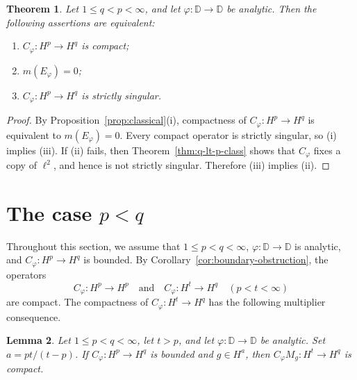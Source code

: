 \documentclass[11pt, reqno]{amsart}
\newtheorem{theorem}{Theorem}[section]
\newtheorem{lemma}[theorem]{Lemma}
\theoremstyle{definition}
\theoremstyle{remark}
\newcommand{\D}{\mathbb{D}}
\begin{document}
\begin{theorem}
\label{thm:q-lt-p-identity}
Let \(1\le q<p<\infty\), and let \(\varphi:\D\to\D\) be analytic.
Then the following assertions are equivalent:
\begin{enumerate}[label=\textup{(\roman*)}]
\item \(C_\varphi:H^p\to H^q\) is compact;
\item \(m(E_\varphi)=0\);
\item \(C_\varphi:H^p\to H^q\) is strictly singular.
\end{enumerate}
\end{theorem}

\begin{proof}
By
Proposition~\ref{prop:classical}\textup{(i)},
compactness of \(C_\varphi:H^p\to H^q\) is equivalent to
\(m(E_\varphi)=0\). Every compact operator is strictly singular, so
\textup{(i)} implies \textup{(iii)}. If \textup{(ii)} fails, then
Theorem~\ref{thm:q-lt-p-class} shows that
\(C_\varphi\) fixes a copy of \(\ell^2\), and hence is not strictly
singular. Therefore \textup{(iii)} implies \textup{(ii)}.
\end{proof} \smallskip 



\section{\texorpdfstring{The case \(p<q\)}
{The case p < q}}
\label{sec:p-lt-q}


Throughout this section, we assume that \(1\le p<q<\infty\), \(\varphi:\D\to\D\) is analytic, and \(C_\varphi:H^p\to H^q\) is bounded. By
Corollary~\ref{cor:boundary-obstruction}, the operators
\[
        C_\varphi:H^p\to H^p
        \quad\text{and}\quad
        C_\varphi:H^t\to H^q
        \quad (p<t<\infty)
\]
are compact. The compactness of \(C_\varphi:H^t\to H^q\) has the
following multiplier consequence.

\begin{lemma}
\label{lem:mult-compact}
Let \(1\le p<q<\infty\), let \(t>p\), and let
\(\varphi:\D\to\D\) be analytic. Set
\(a=pt/(t-p)\).
If \(C_\varphi:H^p\to H^q\) is bounded and \(g\in H^a\), then
\(C_\varphi M_g:H^t\to H^q\) is compact.
\end{lemma}
\end{document}
